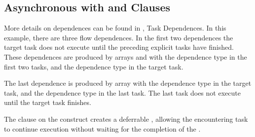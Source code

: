 \subsection{Asynchronous  with  and  Clauses}
\label{subsec:async_target_nowait_depend}

More details on dependences can be found in , Task 
Dependences. In this example, there are three flow dependences.  In the first two dependences the
target task does not execute until the preceding explicit tasks have finished.   These 
dependences are produced by arrays  and   with the  dependence type in the first two tasks, and the  dependence type in the target task.   

The last dependence is produced by array   with the  dependence type in the target task, and the  dependence type in the last task.  The last task does not execute until the target task finishes.  

The  clause on the  construct creates a deferrable , allowing the encountering task to continue execution without waiting for the completion of the .



